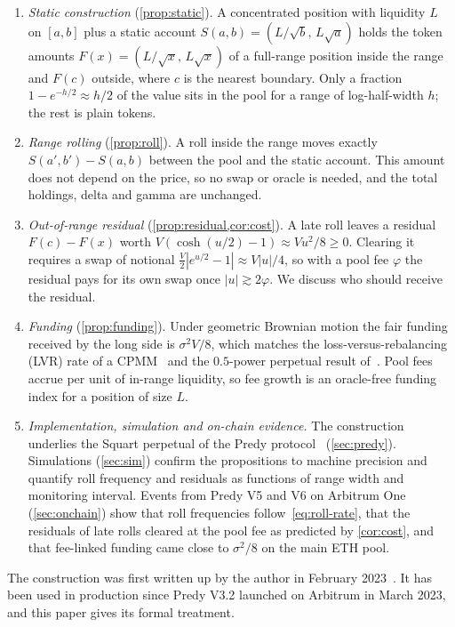 \documentclass[11pt]{article}
\theoremstyle{definition}
\theoremstyle{remark}
\begin{document}
\begin{enumerate}
  \item \emph{Static construction} (\cref{prop:static}). A concentrated position with liquidity $L$ on $[a,b]$ plus a static account $S(a,b)=(L/\sqrt{b},\,L\sqrt{a})$ holds the token amounts $F(x)=(L/\sqrt{x},\,L\sqrt{x})$ of a full-range position inside the range and $F(c)$ outside, where $c$ is the nearest boundary. Only a fraction $1-e^{-h/2}\approx h/2$ of the value sits in the pool for a range of log-half-width $h$; the rest is plain tokens.
  \item \emph{Range rolling} (\cref{prop:roll}). A roll inside the range moves exactly $S(a',b')-S(a,b)$ between the pool and the static account. This amount does not depend on the price, so no swap or oracle is needed, and the total holdings, delta and gamma are unchanged.
  \item \emph{Out-of-range residual} (\cref{prop:residual,cor:cost}). A late roll leaves a residual $F(c)-F(x)$ worth $V(\cosh(u/2)-1)\approx Vu^2/8\ge 0$. Clearing it requires a swap of notional $\tfrac{V}{2}|e^{u/2}-1|\approx V|u|/4$, so with a pool fee $\varphi$ the residual pays for its own swap once $|u|\gtrsim 2\varphi$. We discuss who should receive the residual.
  \item \emph{Funding} (\cref{prop:funding}). Under geometric Brownian motion the fair funding received by the long side is $\sigma^2V/8$, which matches the loss-versus-rebalancing (LVR) rate of a CPMM~\cite{milionis2022lvr} and the $0.5$-power perpetual result of~\cite{robinson2024perp}. Pool fees accrue per unit of in-range liquidity, so fee growth is an oracle-free funding index for a position of size $L$.
  \item \emph{Implementation, simulation and on-chain evidence.} The construction underlies the Squart perpetual of the Predy protocol~\cite{predy2023sqrt,predy2024c4} (\cref{sec:predy}). Simulations (\cref{sec:sim}) confirm the propositions to machine precision and quantify roll frequency and residuals as functions of range width and monitoring interval. Events from Predy V5 and V6 on Arbitrum One (\cref{sec:onchain}) show that roll frequencies follow~\eqref{eq:roll-rate}, that the residuals of late rolls cleared at the pool fee as predicted by \cref{cor:cost}, and that fee-linked funding came close to $\sigma^2/8$ on the main ETH pool.
\end{enumerate}

The construction was first written up by the author in February 2023~\cite{hiya2023note}. It has been used in production since Predy V3.2 launched on Arbitrum in March 2023, and this paper gives its formal treatment.
\end{document}

